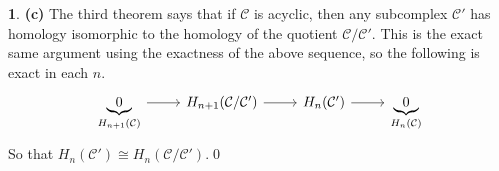 \documentclass[10.5pt]{article}
\theoremstyle{definition}
\newtheorem{pb}{}
\begin{document}
\begin{pb}
        \textbf{(c)} The third theorem says that if \(\mathcal{C}\) is acyclic, then any subcomplex \(\mathcal{C}'\) has homology isomorphic to the homology of the quotient \(\mathcal{C}/\mathcal{C}'\). This is the exact same argument using the exactness of the above sequence, so the following is exact in each \(n\).
        \begin{equation*}
            \begin{tikzcd}
                \underbrace{0}_{H_{n+1}(\mathcal{C})} \arrow{r} & H_{n+1}(\mathcal{C}/\mathcal{C}') \arrow{r} &H_n(\mathcal{C}') \arrow{r} & \underbrace{0}_{H_n(\mathcal{C})}
            \end{tikzcd}
        \end{equation*}
        So that \(H_n(\mathcal{C}') \cong H_n(\mathcal{C}/\mathcal{C}')\).\qed
    \end{pb}
\end{document}
